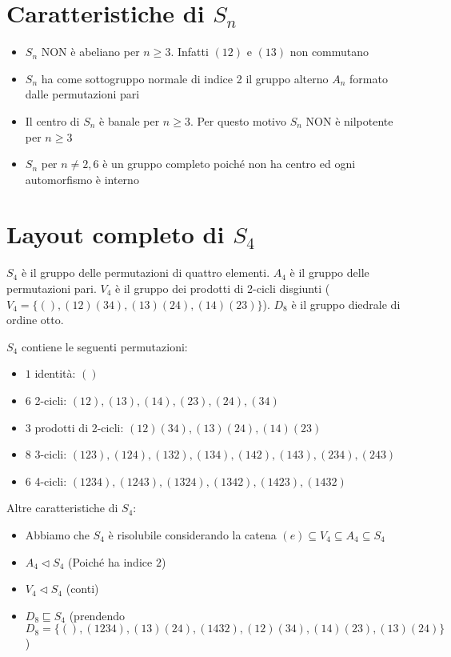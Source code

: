 \documentclass[a4paper,NoNotes,GeneralMath]{stdmdoc}
\newcommand{\sgr}{\sqsubseteq}
\newcommand{\nrm}{\lhd}
\begin{document}
	\section*{Caratteristiche di $S_n$}
	\begin{itemize}
		\item $S_n$ NON è abeliano per $n \ge 3$. Infatti $(1 2)$ e $(1 3)$ non commutano
		\item $S_n$ ha come sottogruppo normale di indice 2 il gruppo alterno $A_n$ formato dalle permutazioni pari
		\item Il centro di $S_n$ è banale per $n \ge 3$. Per questo motivo $S_n$ NON è nilpotente per $n \ge 3$
		\item $S_n$ per $n\neq 2,6$ è un gruppo completo poiché non ha centro ed ogni automorfismo è interno
	\end{itemize}

	\section*{Layout completo di $S_4$}
	$S_4$ è il gruppo delle permutazioni di quattro elementi. $A_4$ è il gruppo delle permutazioni pari. $V_4$ è il gruppo dei prodotti di 2-cicli disgiunti ($V_4 = \{(), (12)(34), (13)(24), (14)(23)\}$). $D_8$ è il gruppo diedrale di ordine otto.

	$S_4$ contiene le seguenti permutazioni:
	\begin{itemize}
		\item $1$ identità: $()$
		\item $6$ 2-cicli: $(12), (13), (14), (23), (24), (34)$
		\item $3$ prodotti di 2-cicli: $(12)(34), (13)(24), (14)(23)$
		\item $8$ 3-cicli: $(123), (124), (132), (134), (142), (143), (234), (243)$
		\item $6$ 4-cicli: $(1234), (1243), (1324), (1342), (1423), (1432)$
	\end{itemize}

	Altre caratteristiche di $S_4$:
	\begin{itemize}
		\item Abbiamo che $S_4$ è risolubile considerando la catena $(e) \subseteq V_4 \subseteq A_4 \subseteq S_4$
		\item $A_4 \nrm S_4$ (Poiché ha indice $2$)
		\item $V_4 \nrm S_4$ (conti)
		\item $D_8 \sgr S_4$ (prendendo $D_8 = \{(), (1234), (13)(24), (1432), (12)(34), (14)(23), (13)(24)\}$)
	\end{itemize}
\end{document}
